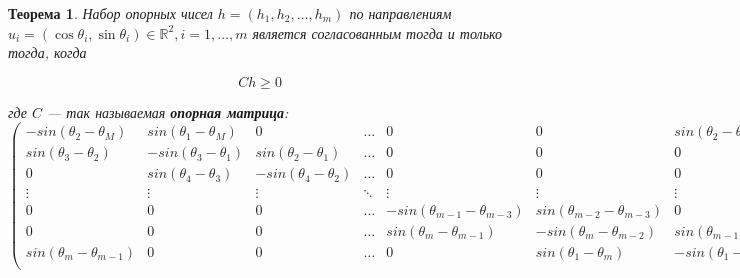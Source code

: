 \documentclass[a4paper, 10pt]{article}
\theoremstyle{definition}
\theoremstyle{plain}
\newtheorem{SmartTheorem}{Теорема}
\theoremstyle{plain}
\begin{document}
\begin{SmartTheorem}
 \label{theorem:support-theorem}
  Набор опорных чисел $h = (h_{1}, h_{2}, \ldots, h_{m})$ по направлениям
  $u_{i} = (\cos \theta_{i}, \sin \theta_{i}) \in \mathbb{R}^{2},
  i = 1, \ldots, m$ является согласованным тогда и только тогда, когда

  \begin{equation*}
   C h \geq 0
  \end{equation*}

  где $C$ --- так называемая \textbf{опорная матрица}:
 \begin{equation*}
  \left(
  \begin{array}{ccccccc}

   \scriptstyle     -sin(\theta_{2} - \theta_{M}) &
   \scriptstyle     sin(\theta_{1} - \theta_{M}) &
   \scriptstyle     0 &
   \scriptstyle     \ldots &
   \scriptstyle     0 &
   \scriptstyle     0 &
   \scriptstyle     sin(\theta_{2} - \theta_{1}) \\

   \scriptstyle      sin(\theta_{3} - \theta_{2}) &
   \scriptstyle      -sin(\theta_{3} - \theta_{1}) &
   \scriptstyle      sin(\theta_{2} - \theta_{1}) &
   \scriptstyle      \ldots &
   \scriptstyle      0 &
   \scriptstyle      0 &
   \scriptstyle      0 \\

   \scriptstyle      0 &
   \scriptstyle      sin(\theta_{4} - \theta_{3}) &
   \scriptstyle      -sin(\theta_{4} - \theta_{2}) &
   \scriptstyle      \ldots &
   \scriptstyle      0 &
   \scriptstyle      0 &
   \scriptstyle      0 \\

   \scriptstyle      \vdots &
   \scriptstyle      \vdots &
   \scriptstyle      \vdots &
   \scriptstyle      \ddots &
   \scriptstyle      \vdots &
   \scriptstyle      \vdots &
   \scriptstyle      \vdots \\

   \scriptstyle      0 &
   \scriptstyle      0 &
   \scriptstyle      0 &
   \scriptstyle      \ldots &
   \scriptstyle      -sin(\theta_{m - 1} - \theta_{m - 3}) &
   \scriptstyle      sin(\theta_{m - 2} - \theta_{m - 3}) &
   \scriptstyle      0 \\

   \scriptstyle      0 &
   \scriptstyle      0 &
   \scriptstyle      0 &
   \scriptstyle      \ldots &
   \scriptstyle      sin(\theta_{m} - \theta_{m - 1}) &
   \scriptstyle      -sin(\theta_{m} - \theta_{m - 2}) &
   \scriptstyle      sin(\theta_{m - 1} - \theta_{m - 2}) \\

   \scriptstyle      sin(\theta_{m} - \theta_{m - 1}) &
   \scriptstyle      0 &
   \scriptstyle      0 &
   \scriptstyle      \ldots &
   \scriptstyle      0 &
   \scriptstyle      sin(\theta_{1} - \theta_{m}) &
   \scriptstyle      -sin(\theta_{1} - \theta_{m - 1}) \\
  \end{array}
  \right)
 \end{equation*}

\end{SmartTheorem}
\end{document}
